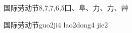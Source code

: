 \begin{entry}{国际劳动节}{8,7,7,6,5}{⼞、⾩、⼒、⼒、⾋}
  \begin{phonetics}{国际劳动节}{guo2ji4 lao2dong4 jie2}
  \end{phonetics}
\end{entry}
